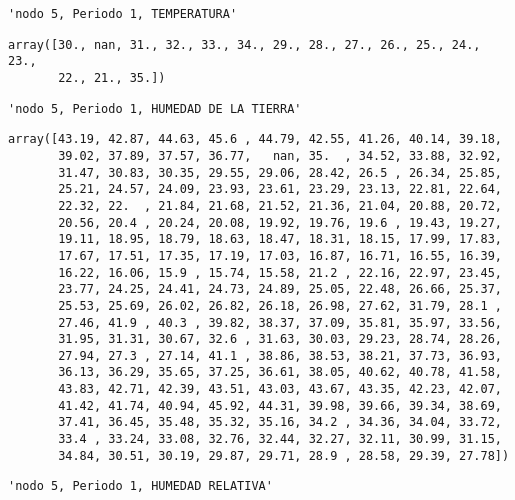 \documentclass[11pt]{article}
\begin{document}
    
    
    \begin{verbatim}
'nodo 5, Periodo 1, TEMPERATURA'
    \end{verbatim}

    
    
    \begin{verbatim}
array([30., nan, 31., 32., 33., 34., 29., 28., 27., 26., 25., 24., 23.,
       22., 21., 35.])
    \end{verbatim}

    
    
    \begin{verbatim}
'nodo 5, Periodo 1, HUMEDAD DE LA TIERRA'
    \end{verbatim}

    
    
    \begin{verbatim}
array([43.19, 42.87, 44.63, 45.6 , 44.79, 42.55, 41.26, 40.14, 39.18,
       39.02, 37.89, 37.57, 36.77,   nan, 35.  , 34.52, 33.88, 32.92,
       31.47, 30.83, 30.35, 29.55, 29.06, 28.42, 26.5 , 26.34, 25.85,
       25.21, 24.57, 24.09, 23.93, 23.61, 23.29, 23.13, 22.81, 22.64,
       22.32, 22.  , 21.84, 21.68, 21.52, 21.36, 21.04, 20.88, 20.72,
       20.56, 20.4 , 20.24, 20.08, 19.92, 19.76, 19.6 , 19.43, 19.27,
       19.11, 18.95, 18.79, 18.63, 18.47, 18.31, 18.15, 17.99, 17.83,
       17.67, 17.51, 17.35, 17.19, 17.03, 16.87, 16.71, 16.55, 16.39,
       16.22, 16.06, 15.9 , 15.74, 15.58, 21.2 , 22.16, 22.97, 23.45,
       23.77, 24.25, 24.41, 24.73, 24.89, 25.05, 22.48, 26.66, 25.37,
       25.53, 25.69, 26.02, 26.82, 26.18, 26.98, 27.62, 31.79, 28.1 ,
       27.46, 41.9 , 40.3 , 39.82, 38.37, 37.09, 35.81, 35.97, 33.56,
       31.95, 31.31, 30.67, 32.6 , 31.63, 30.03, 29.23, 28.74, 28.26,
       27.94, 27.3 , 27.14, 41.1 , 38.86, 38.53, 38.21, 37.73, 36.93,
       36.13, 36.29, 35.65, 37.25, 36.61, 38.05, 40.62, 40.78, 41.58,
       43.83, 42.71, 42.39, 43.51, 43.03, 43.67, 43.35, 42.23, 42.07,
       41.42, 41.74, 40.94, 45.92, 44.31, 39.98, 39.66, 39.34, 38.69,
       37.41, 36.45, 35.48, 35.32, 35.16, 34.2 , 34.36, 34.04, 33.72,
       33.4 , 33.24, 33.08, 32.76, 32.44, 32.27, 32.11, 30.99, 31.15,
       34.84, 30.51, 30.19, 29.87, 29.71, 28.9 , 28.58, 29.39, 27.78])
    \end{verbatim}

    
    
    \begin{verbatim}
'nodo 5, Periodo 1, HUMEDAD RELATIVA'
    \end{verbatim}
\end{document}
